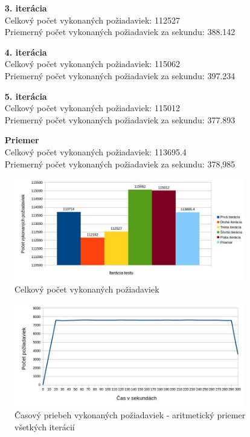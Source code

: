 \documentclass[12pt,oneside,final]{fithesis-utf8}
\begin{document}
\begin{itemize}
\begin{itemize}
\item[\textbf{3. iterácia}]\ \\
Celkový počet vykonaných požiadaviek: 112527\\
Priemerný počet vykonaných požiadaviek za sekundu: 388.142

\item[\textbf{4. iterácia}]\ \\
Celkový počet vykonaných požiadaviek: 115062\\
Priemerný počet vykonaných požiadaviek za sekundu: 397.234

\item[\textbf{5. iterácia}]\ \\
Celkový počet vykonaných požiadaviek: 115012\\
Priemerný počet vykonaných požiadaviek za sekundu: 377.893

\item[\textbf{Priemer}]\ \\
Celkový počet vykonaných požiadaviek: 113695.4\\
Priemerný počet vykonaných požiadaviek za sekundu: 378,985	

\end{itemize}

\begin{figure}[H]
  \centering
      \includegraphics[width=0.9\textwidth]{perfcake4.jpg}
  \caption{Celkový počet vykonaných požiadaviek}
\end{figure}

\begin{figure}[H]
  \centering
      \includegraphics[width=0.9\textwidth]{perfcake4_distr.jpg}
  \caption{Časový priebeh vykonaných požiadaviek - aritmetický priemer všetkých iterácií}
\end{figure}

\end{itemize}
\end{document}

